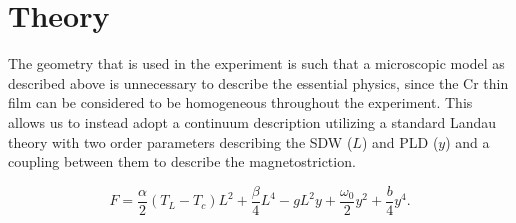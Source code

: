 \section{Theory}


The geometry that is used in the experiment is such that a microscopic model as described above is unnecessary to describe the essential physics, since the Cr thin film can be considered to be homogeneous throughout the experiment. This allows us to instead adopt a continuum description utilizing a standard Landau theory with two order parameters describing the SDW ($L$) and PLD ($y$) and a coupling between them to describe the magnetostriction.  

\begin{equation}
	\label{eq:Cr_landau}
	F = \frac{\alpha}{2}(T_L-T_c) L^2 + \frac{\beta}{4} L^4 - g L^2 y + \frac{\omega_0}{2} y^2 + \frac{b}{4} y^4.
\end{equation}

